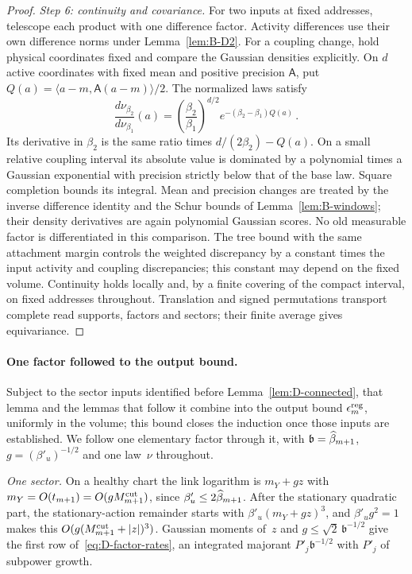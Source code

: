 \begin{proof}
\emph{Step 6: continuity and covariance.} For two inputs at fixed addresses, telescope each product with one difference factor. Activity differences use their own difference norms under Lemma~\ref{lem:B-D2}. For a coupling change, hold physical coordinates fixed and compare the Gaussian densities explicitly. On $d$ active coordinates with fixed mean and positive precision $\mathsf A$, put $Q(a)=\langle a-m,\mathsf A(a-m)\rangle/2$. The normalized laws satisfy
\begin{equation*}
\frac{d\nu_{\beta_2}}{d\nu_{\beta_1}}(a)
=\left(\frac{\beta_2}{\beta_1}\right)^{d/2}
 e^{-(\beta_2-\beta_1)Q(a)}\,.
\end{equation*}
Its derivative in $\beta_2$ is the same ratio times $d/(2\beta_2)-Q(a)$. On a small relative coupling interval its absolute value is dominated by a polynomial times a Gaussian exponential with precision strictly below that of the base law. Square completion bounds its integral. Mean and precision changes are treated by the inverse difference identity and the Schur bounds of Lemma~\ref{lem:B-windows}; their density derivatives are again polynomial Gaussian scores. No old measurable factor is differentiated in this comparison. The tree bound with the same attachment margin controls the weighted discrepancy by a constant times the input activity and coupling discrepancies; this constant may depend on the fixed volume. Continuity holds locally and, by a finite covering of the compact interval, on fixed addresses throughout. Translation and signed permutations transport complete read supports, factors and sectors; their finite average gives equivariance.
\end{proof}

\paragraph{One factor followed to the output bound.} Subject to the sector inputs identified before Lemma~\ref{lem:D-connected}, that lemma and the lemmas that follow it combine into the output bound $\epsilon^{\rm reg}_m$, uniformly in the volume; this bound closes the induction once those inputs are established. We follow one elementary factor through it, with $\mathfrak b=\widehat{\beta}_{m+1}$, $g=(\beta'_u)^{-1/2}$ and one law~$\nu$ throughout.

\emph{One sector.} On a healthy chart the link logarithm is $m_Y+gz$ with $m_Y=O(t_{m+1})=O(gM^{\mathrm{cut}}_{m+1})$, since $\beta'_u\le2\widehat{\beta}_{m+1}$. After the stationary quadratic part, the stationary-action remainder starts with $\beta'_u(m_Y+gz)^3$, and $\beta'_ug^2=1$ makes this $O(g(M^{\mathrm{cut}}_{m+1}+|z|)^3)$. Gaussian moments of~$z$ and $g\le\sqrt2\,\mathfrak b^{-1/2}$ give the first row of~\eqref{eq:D-factor-rates}, an integrated majorant $P'_j\mathfrak b^{-1/2}$ with $P'_j$ of subpower growth.

